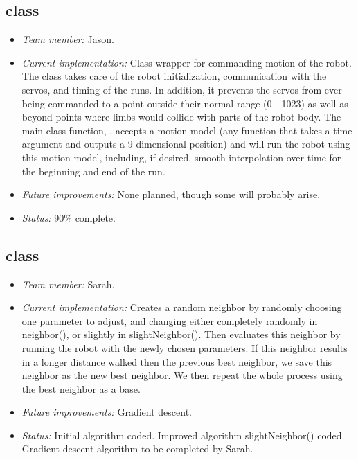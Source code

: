 \subsection*{ class}

\begin{itemize}
\item \emph{Team member:} Jason.
\item \emph{Current implementation:} Class wrapper for commanding
  motion of the robot.  The  class takes care of the robot
  initialization, communication with the servos, and timing of the
  runs.  In addition, it prevents the servos from ever being commanded
  to a point outside their normal range (0 - 1023) as well as beyond
  points where limbs would collide with parts of the robot body.  The
  main class function, , accepts a motion model (any
  function that takes a time argument and outputs a 9 dimensional
  position) and will run the robot using this motion model, including,
  if desired, smooth interpolation over time for the beginning and end
  of the run.
\item \emph{Future improvements:} None planned, though some will
  probably arise.
\item \emph{Status:} 90\% complete.
\end{itemize}



\subsection*{ class}

\begin{itemize}
\item \emph{Team member:} Sarah.
\item \emph{Current implementation:} Creates a random neighbor by
  randomly choosing one parameter to adjust, and changing either
  completely randomly in neighbor(), or slightly in
  slightNeighbor(). Then evaluates this neighbor by running the robot
  with the newly chosen parameters. If this neighbor results in a
  longer distance walked then the previous best neighbor, we save this
  neighbor as the new best neighbor. We then repeat the whole process
  using the best neighbor as a base.
\item \emph{Future improvements:} Gradient descent.
\item \emph{Status:} Initial algorithm coded. Improved algorithm
  slightNeighbor() coded. Gradient descent algorithm to be completed
  by Sarah.
\end{itemize}



